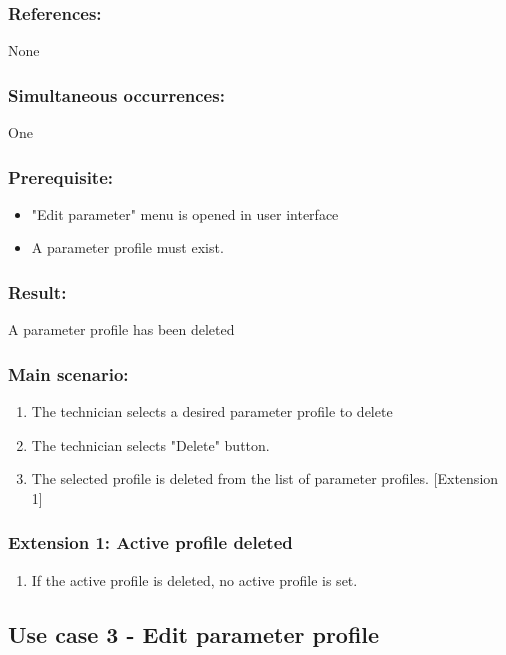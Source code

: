 \subsubsection*{References:}
None

\subsubsection*{Simultaneous occurrences:}
One

\subsubsection*{Prerequisite:}
\begin{itemize}
	\item "Edit parameter" menu is opened in user interface
	\item A parameter profile must exist.
\end{itemize}

\subsubsection*{Result:}
A parameter profile has been deleted

\subsubsection*{Main scenario:}
\begin{enumerate}
	\item The technician selects a desired parameter profile to delete
	\item The technician selects "Delete" button.
	\item The selected profile is deleted from the list of parameter profiles. [Extension 1]
\end{enumerate}	

\subsubsection*{Extension 1: Active profile deleted}
	\begin{enumerate}
		\item If the active profile is deleted, no active profile is set.
	\end{enumerate}


\subsection{Use case 3 - Edit parameter profile}
